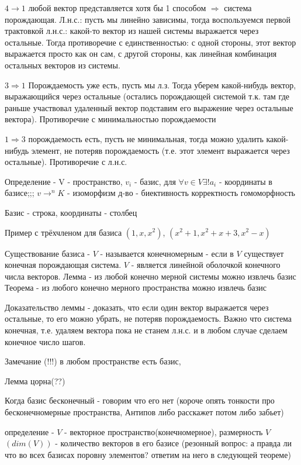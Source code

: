 \documentclass[12pt]{article}
\begin{document}
$4 \rightarrow 1$ любой вектор представляется хотя бы 1 способом $\Rightarrow$ система порождающая. Л.н.с.: пусть мы линейно зависимы, тогда воспользуемся первой трактовкой л.н.с.: какой-то вектор из нашей системы выражается через остальные. Тогда противоречие с единственностью: с одной стороны, этот вектор выражается просто как он сам, с другой стороны, как линейная комбинация остальных векторов из системы.

$3 \Rightarrow 1$ Порождаемость уже есть, пусть мы л.з. Тогда уберем какой-нибудь вектор, выражающийся через остальные (остались порождающей системой т.к. там где раньше участвовал удаленный вектор подставим его выражение через остальные вектора). Противоречие с минимальностью порождаемости

$1 \Rightarrow 3$ порождаемость есть, пусть не минимальная, тогда можно удалить какой-нибудь элемент, не потеряв порождаемость (т.е. этот элемент выражается через остальные). Противоречие с л.н.с.


Определение - V - пространство, ${v_i}$ - базис, для $\forall v \in V \exists !{a_i}$ - координаты в базисе;;; $v \rightarrow ^nK$ - изоморфизм
д-во - биективность корректность гомоморфность 

Базис - строка, координаты - столбец

Пример с трёхчленом для базиса $(1 , x, x^2)$, $(x^2 + 1, x^2 + x + 3, x^2 - x)$ 


Существование базиса - $V$ - называется конечномерным - если в $V$ существует конечная порождающая система. $V$ - является линейной оболочкой конечного числа векторов.
Лемма - из любой конечно мерной системы можно извлечь базис
Теорема - из любого конечно мерного пространства можно извлечь базис

Доказательство леммы - доказать, что если один вектор выражается через остальные, то его можно убрать, не потеряв порождаемость. Важно что система конечная, т.е. удаляем вектора пока не станем л.н.с. и в любом случае сделаем конечное число шагов.

Замечание (!!!) в любом пространстве есть базис, 

Лемма цорна(??)

Когда базис бесконечный - говорим что его нет (короче опять тонкости про бесконечномерные пространства, Антипов либо расскажет потом либо забьет)

определение - $V$ - векторное пространство(конечномерное), размерность $V$ $(dim(V))$ - количество векторов в его базисе (резонный вопрос: а правда ли что во всех базисах поровну элементов? ответим на него в следующей теореме)
\end{document}
